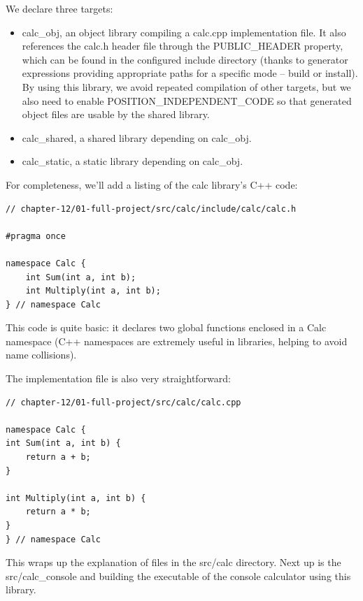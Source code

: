 We declare three targets:

\begin{itemize}
\item 
calc\_obj, an object library compiling a calc.cpp implementation file. It also references the calc.h header file through the PUBLIC\_HEADER property, which can be found in the configured include directory (thanks to generator expressions providing appropriate paths for a specific mode – build or install). By using this library, we avoid repeated compilation of other targets, but we also need to enable POSITION\_INDEPENDENT\_CODE so that generated object files are usable by the shared library.

\item 
calc\_shared, a shared library depending on calc\_obj.

\item 
calc\_static, a static library depending on calc\_obj.
\end{itemize}

For completeness, we'll add a listing of the calc library's C++ code:

\begin{lstlisting}[style=styleCXX]
// chapter-12/01-full-project/src/calc/include/calc/calc.h

#pragma once

namespace Calc {
	int Sum(int a, int b);
	int Multiply(int a, int b);
} // namespace Calc
\end{lstlisting}

This code is quite basic: it declares two global functions enclosed in a Calc namespace (C++ namespaces are extremely useful in libraries, helping to avoid name collisions).

The implementation file is also very straightforward:

\begin{lstlisting}[style=styleCXX]
// chapter-12/01-full-project/src/calc/calc.cpp

namespace Calc {
int Sum(int a, int b) {
	return a + b;
}

int Multiply(int a, int b) {
	return a * b;
}
} // namespace Calc
\end{lstlisting}

This wraps up the explanation of files in the src/calc directory. Next up is the src/calc\_console and building the executable of the console calculator using this library.


